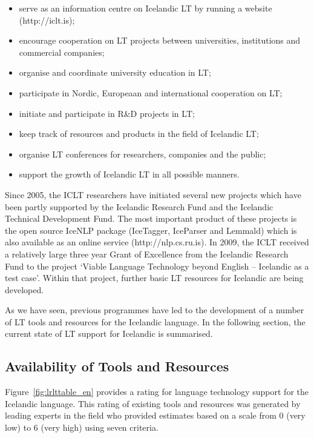 \begin{multicols}{2}
\begin{itemize}
\item serve as an information centre on Icelandic LT by running a website (http://iclt.is); 
\item encourage cooperation on LT projects between universities, institutions and commercial companies;
\item organise and coordinate university education in LT;
\item participate in Nordic, Europeaan and international cooperation on LT;
\item initiate and participate in R\&D projects in LT;
\item keep track of resources and products in the field of Icelandic LT;
\item organise LT conferences for researchers, companies and the public;
\item support the growth of Icelandic LT in all possible manners.
\end{itemize}

Since 2005, the ICLT researchers have initiated several new projects which have been partly supported by the Icelandic Research Fund and the Icelandic Technical Development Fund. The most important product of these projects is the open source IceNLP package (IceTagger, IceParser and Lemmald) \cite{icenlp1} which is also available as an online service (http://nlp.cs.ru.is). In 2009, the ICLT received a relatively large three year Grant of Excellence from the Icelandic Research Fund to the project ‘Viable Language Technology beyond English -- Icelandic as a test case’. Within that project, further basic LT resources for Icelandic are being developed.

As we have seen, previous programmes have led to the development of a number of LT tools and resources for the Icelandic language. In the following section, the current state of LT support for Icelandic is summarised.
  
\subsection{Availability of Tools and Resources}

Figure~\ref{fig:lrlttable_en} provides a rating for language technology support for the Icelandic language. This rating of existing tools and resources was generated by leading experts in the field who provided estimates based on a scale from 0 (very low) to 6 (very high) using seven criteria.


\end{multicols}
